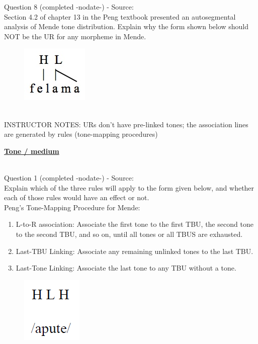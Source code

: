 \documentclass[12pt]{article}
\begin{document}
{\large Question 8} (completed -nodate-) - Source: \\

Section 4.2 of chapter 13 in the Peng textbook presented an autosegmental analysis of Mende tone distribution. Explain why the form shown below should NOT be the UR for any morpheme in Mende.\\

\begin{figure}[H]
\includegraphics{../images/mende_junction_d.png}
\end{figure}

~\\
INSTRUCTOR NOTES: URs don't have pre-linked tones; the association lines are generated by rules (tone-mapping procedures)


\newpage\textbf{\underline{\huge Tone / medium\\}}

~\\

{\large Question 1} (completed -nodate-) - Source: \\

Explain which of the three rules will apply to the form given below, and whether each of those rules would have an effect or not.\\

Peng’s Tone-Mapping Procedure for Mende: \begin{enumerate} \item L-to-R association: Associate the first tone to the first TBU, the second tone to the second TBU, and so on, until all tones or all TBUS are exhausted. \item Last-TBU Linking: Associate any remaining unlinked tones to the last TBU. \item Last-Tone Linking: Associate the last tone to any TBU without a tone. \end{enumerate}

\begin{figure}[H]
\includegraphics{../images/mendetone_a.png}
\end{figure}
\end{document}
